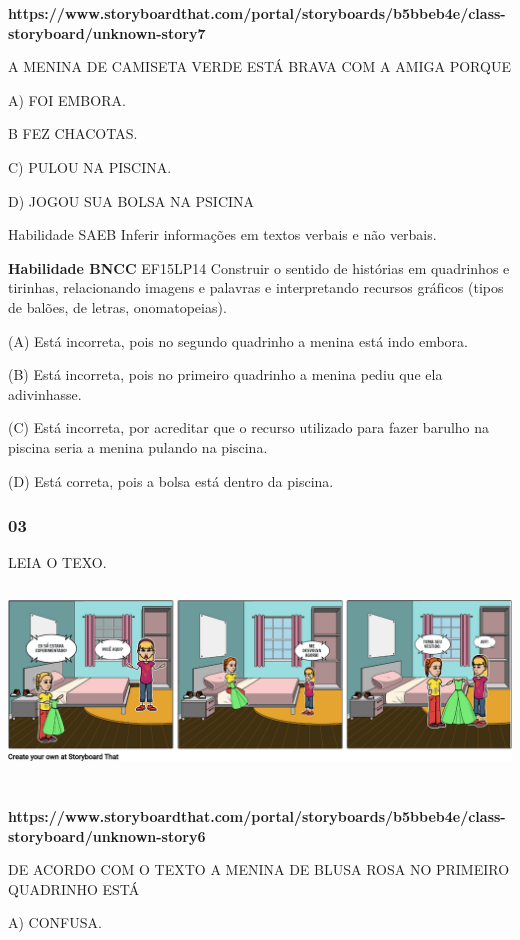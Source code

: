 \begin{escola}
\textbf{https://www.storyboardthat.com/portal/storyboards/b5bbeb4e/class-storyboard/unknown-story7}

A MENINA DE CAMISETA VERDE ESTÁ BRAVA COM A AMIGA PORQUE

A) FOI EMBORA.

B FEZ CHACOTAS.

C) PULOU NA PISCINA.

D) JOGOU SUA BOLSA NA PSICINA

Habilidade SAEB Inferir informações em textos verbais e não verbais.

\textbf{Habilidade BNCC} EF15LP14 Construir o sentido de histórias em
quadrinhos e tirinhas, relacionando imagens e palavras e interpretando
recursos gráficos (tipos de balões, de letras, onomatopeias).

(A) Está incorreta, pois no segundo quadrinho a menina está indo embora.

(B) Está incorreta, pois no primeiro quadrinho a menina pediu que ela
adivinhasse.

(C) Está incorreta, por acreditar que o recurso utilizado para fazer
barulho na piscina seria a menina pulando na piscina.

(D) Está correta, pois a bolsa está dentro da
piscina.\protect\hypertarget{_heading=h.tt4s01xrdwwn}{}{}

\subsubsection{03 }\label{section-25}

LEIA O
TEXO.\includegraphics[width=6.07986in,height=2.24583in]{media/image182.png}

\textbf{https://www.storyboardthat.com/portal/storyboards/b5bbeb4e/class-storyboard/unknown-story6}

DE ACORDO COM O TEXTO A MENINA DE BLUSA ROSA NO PRIMEIRO QUADRINHO ESTÁ

A) CONFUSA.


\end{escola}
